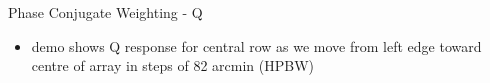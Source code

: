 \documentclass[pdf,azure,slideColor,colorBG]{prosper}
\begin{document}
\begin{slide}{Phase Conjugate Weighting - Q}
\begin{small}
\begin{itemize}
\item demo shows Q response for central row as we move from left edge toward centre of array in steps of 82 arcmin (HPBW)
\end{itemize}
\end {small}
{\centering
{}
}
\end{slide}
\end{document}
